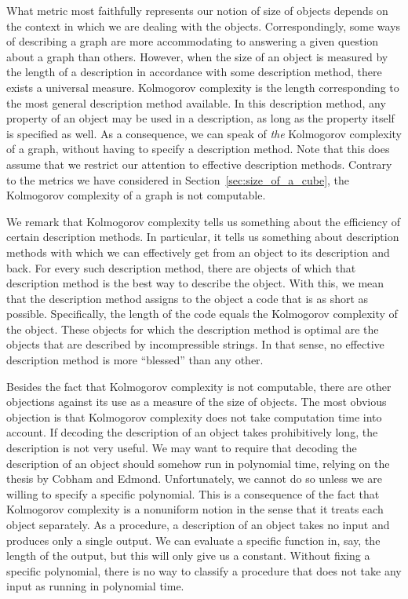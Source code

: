 What metric most faithfully represents our notion of size of objects depends on the context in which we are dealing with the objects.
Correspondingly, some ways of describing a graph are more accommodating to answering a given question about a graph than others.
However, when the size of an object is measured by the length of a description in accordance with some description method, there exists a universal measure.
Kolmogorov complexity is the length corresponding to the most general description method available.
In this description method, any property of an object may be used in a description, as long as the property itself is specified as well.
As a consequence, we can speak of \emph{the} Kolmogorov complexity of a graph, without having to specify a description method.
Note that this does assume that we restrict our attention to effective description methods.
Contrary to the metrics we have considered in Section~\ref{sec:size_of_a_cube}, the Kolmogorov complexity of a graph is not computable.

We remark that Kolmogorov complexity tells us something about the efficiency of certain description methods.
In particular, it tells us something about description methods with which we can effectively get from an object to its description and back.
For every such description method, there are objects of which that description method is the best way to describe the object.
With this, we mean that the description method assigns to the object a code that is as short as possible.
Specifically, the length of the code equals the Kolmogorov complexity of the object.
These objects for which the description method is optimal are the objects that are described by incompressible strings.
In that sense, no effective description method is more \enquote{blessed} than any other.

Besides the fact that Kolmogorov complexity is not computable, there are other objections against its use as a measure of the size of objects.
The most obvious objection is that Kolmogorov complexity does not take computation time into account.
If decoding the description of an object takes prohibitively long, the description is not very useful.
We may want to require that decoding the description of an object should somehow run in polynomial time, relying on the thesis by Cobham and Edmond.
Unfortunately, we cannot do so unless we are willing to specify a specific polynomial.
This is a consequence of the fact that Kolmogorov complexity is a nonuniform notion in the sense that it treats each object separately.
As a procedure, a description of an object takes no input and produces only a single output.
We can evaluate a specific function in, say, the length of the output, but this will only give us a constant.
Without fixing a specific polynomial, there is no way to classify a procedure that does not take any input as running in polynomial time.

